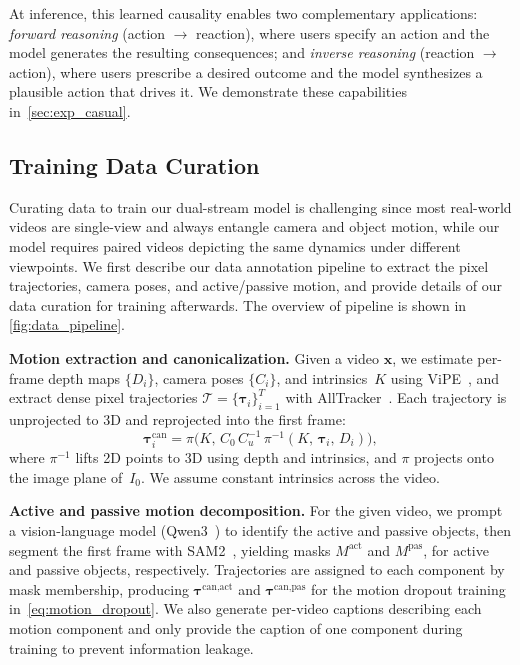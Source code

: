 At inference, this learned causality enables two complementary applications:
\emph{forward reasoning} (action $\to$ reaction), where users specify an
action and the model generates the resulting consequences; and
\emph{inverse reasoning} (reaction $\to$ action), where users prescribe a desired outcome and the model synthesizes a plausible action that drives it. We demonstrate these capabilities in~\cref{sec:exp_casual}.




\subsection{Training Data Curation}
\label{sec:data}
Curating data to train our dual-stream model is challenging since most real-world videos are single-view and always entangle camera and object motion, while our model requires paired videos depicting the same dynamics under different viewpoints. We first describe our data annotation pipeline to extract the pixel trajectories,  camera poses, and active/passive motion, and provide details of our data curation for training afterwards. The overview of pipeline is shown in \cref{fig:data_pipeline}.

\noindent\textbf{Motion extraction and canonicalization.}\quad
Given a video $\mathbf{x}$, we estimate per-frame depth maps $\{D_i\}$, camera poses $\{C_i\}$, and intrinsics~$K$ using ViPE~\cite{huang2025vipe}, and extract dense pixel trajectories $\mathcal{T}=\{\boldsymbol{\tau}_i\}_{i=1}^{T}$ with AllTracker~\cite{harley2025alltracker}.
Each trajectory is unprojected to 3D and reprojected into the first frame:
\begin{equation}
  \boldsymbol{\tau}^{\text{can}}_i
  = \pi\!\bigl(
    K,\, C_0\, C_u^{-1}\,
    \pi^{-1}(K,\, \boldsymbol{\tau}_i,\, D_i)
  \bigr),
  \label{eq:reproject}
\end{equation}
where $\pi^{-1}$ lifts 2D points to 3D using depth and intrinsics, and
$\pi$ projects onto the image plane of~$I_0$. We assume constant intrinsics across the video.

\noindent\textbf{Active and passive motion decomposition.}\quad
For the given video, we prompt a vision-language model (Qwen3~\cite{Qwen3-VL}) to identify the active and passive objects, then segment the first frame with SAM2~\cite{ravi2024sam2}, yielding masks $M^{\text{act}}$ and $M^{\text{pas}}$, for active and passive objects, respectively.
Trajectories are assigned to each component by mask membership, producing $\boldsymbol{\tau}^{\text{can,act}}$ and $\boldsymbol{\tau}^{\text{can,pas}}$
for the motion dropout training in~\cref{eq:motion_dropout}.
We also generate per-video captions describing each motion component and only provide the caption of one component during training to prevent information leakage.

